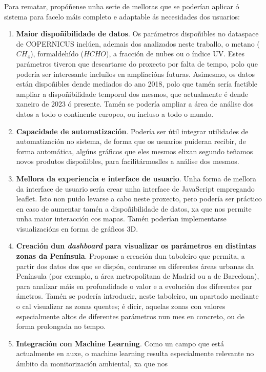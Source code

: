 Para rematar, propóñense unha serie de melloras que se poderían aplicar ó sistema para facelo máis completo e adaptable ás necesidades dos usuarios:
\begin{enumerate}
    \item \textbf{Maior dispoñibilidade de datos}. Os parámetros dispoñibles no dataspace de COPERNICUS inclúen, ademais dos analizados neste traballo, o metano ($CH_4$), formaldehído ($HCHO$), a
    fracción de nubes ou o índice UV. Estes parámetros tiveron que descartarse do proxecto por falta de tempo, polo que podería ser interesante incluílos en ampliacións futuras. Asimesmo, os datos
    están dispoñibles dende mediados do ano 2018, polo que tamén sería factible ampliar a dispoñibilidade temporal dos mesmos, que actualmente é dende xaneiro de 2023 ó presente. Tamén se podería
    ampliar a área de análise dos datos a todo o continente europeo, ou incluso a todo o mundo.
    \item \textbf{Capacidade de automatización}. Podería ser útil integrar utilidades de automatización no sistema, de forma que os usuarios puideran recibir, de forma automática, algúns gráficos
    que eles mesmos elixan segundo teñamos novos produtos dispoñibles, para facilitármoslles a análise dos mesmos.
    \item \textbf{Mellora da experiencia e interface de usuario}. Unha forma de mellora da interface de usuario sería crear unha interface de JavaScript empregando leaflet. Isto non puido levarse a
    cabo neste proxecto, pero podería ser práctico en caso de aumentar tamén a dispoñibilidade de datos, xa que nos permite unha maior interacción cos mapas. Tamén poderían implementarse
    visualizacións en forma de gráficos 3D.
    \item \textbf{Creación dun \textit{dashboard} para visualizar os parámetros en distintas zonas da Península}. Proponse a creación dun taboleiro que permita, a partir dos datos dos que se dispón,
    centrarse en diferentes áreas urbanas da Península (por exemplo, a área metropolitana de Madrid ou a de Barcelona), para analizar máis en profundidade o valor e a evolución dos diferentes par
    ámetros. Tamén se podería introducir, neste taboleiro, un apartado mediante o cal visualizar as zonas quentes; é dicir, aquelas zonas con valores especialmente altos de diferentes parámetros
    nun mes en concreto, ou de forma prolongada no tempo.
    \item \textbf{Integración con Machine Learning}. Como un campo que está actualmente en auxe, o machine learning resulta especialmente relevante no ámbito da monitorización ambiental, xa que nos

\end{enumerate}
